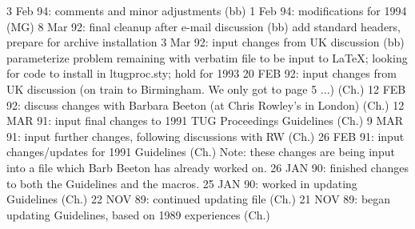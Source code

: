  3 Feb 94: comments and minor adjustments (bb)
 1 Feb 94: modifications for 1994 (MG)
 8 Mar 92: final cleanup after e-mail discussion (bb)
           add standard headers, prepare for archive installation
 3 Mar 92: input changes from UK discussion (bb)
           parameterize \MtgYear
           problem remaining with verbatim file to be input to LaTeX;
             looking for code to install in ltugproc.sty; hold for 1993
20 FEB 92: input changes from UK discussion (on train to Birmingham.
           We only got to page 5 ...) (Ch.)
12 FEB 92: discuss changes with Barbara Beeton (at Chris Rowley's
           in London) (Ch.)
12 MAR 91: input final changes to 1991 TUG Proceedings Guidelines (Ch.)
 9 MAR 91: input further changes, following discussions with RW (Ch.)
26 FEB 91: input changes/updates for 1991 Guidelines (Ch.)
           Note: these changes are being input into a file
                 which Barb Beeton has already worked on.
26 JAN 90: finished changes to both the Guidelines and the macros.
25 JAN 90: worked in updating Guidelines (Ch.)
22 NOV 89: continued updating file (Ch.)
21 NOV 89: began updating Guidelines, based on 1989 experiences (Ch.)
